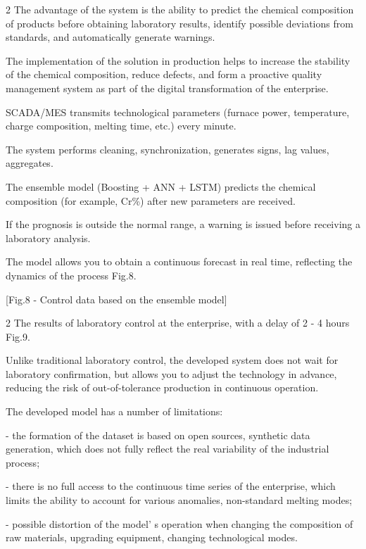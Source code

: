 \begin{multicols}{2}
The advantage of the system is the ability to predict the chemical
composition of products before obtaining laboratory results, identify
possible deviations from standards, and automatically generate warnings.

The implementation of the solution in production helps to increase the
stability of the chemical composition, reduce defects, and form a
proactive quality management system as part of the digital
transformation of the enterprise.

SCADA/MES transmits technological parameters (furnace power,
temperature, charge composition, melting time, etc.) every minute.

The system performs cleaning, synchronization, generates signs, lag
values, aggregates.

The ensemble model (Boosting + ANN + LSTM) predicts the chemical
composition (for example, Cr\%) after new parameters are received.

If the prognosis is outside the normal range, a warning is issued before
receiving a laboratory analysis.

The model allows you to obtain a continuous forecast in real time,
reflecting the dynamics of the process Fig.8.
\end{multicols}

[Fig.8 - Control data based on the ensemble model]

\begin{multicols}{2}
The results of laboratory control at the enterprise, with a delay of 2 -
4 hours Fig.9.

Unlike traditional laboratory control, the developed system does not
wait for laboratory confirmation, but allows you to adjust the
technology in advance, reducing the risk of out-of-tolerance production
in continuous operation.

The developed model has a number of limitations:

- the formation of the dataset is based on open sources, synthetic data
generation, which does not fully reflect the real variability of the
industrial process;

- there is no full access to the continuous time series of the
enterprise, which limits the ability to account for various anomalies,
non-standard melting modes;

- possible distortion of the model' s operation when
changing the composition of raw materials, upgrading equipment, changing
technological modes.
\end{multicols}

